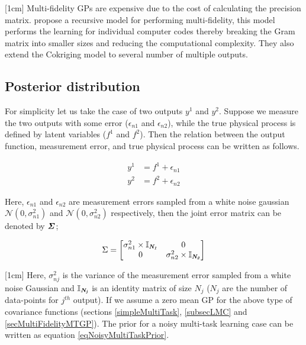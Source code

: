 [1cm]
Multi-fidelity GPs are expensive due to the cost of calculating the precision matrix. \cite{le2013multi} propose a recursive model for performing multi-fidelity, this model performs the learning for individual computer codes thereby breaking the Gram matrix into smaller sizes and reducing the computational complexity. They also extend the Cokriging model to several number of multiple outputs.

\subsection{Posterior distribution}\label{subsecPosteriorDistribution}
For simplicity let us take the case of two outputs \(y^{1}\) and \(y^{2}\). Suppose we measure the two outputs with some error ($\epsilon_{n1}$ and $\epsilon_{n2}$), while the true physical process is defined by latent variables (\(f^{1}\) and \(f^{2}\)). Then the relation between the output function, measurement error, and true physical process can be written as follows. 

\begin{align} \label{eq:relationOutputLatent}
y^{1} & = f^{1} + \epsilon_{n1} \\
y^{2} & = f^{2} + \epsilon_{n2}
\end{align} 

Here, \(\epsilon_{n1}\) and \(\epsilon_{n2}\) are measurement errors sampled from a white noise gaussian \(\mathcal{N}(0, \sigma_{n1}^2)\) and \(\mathcal{N}(0, \sigma_{n2}^2)\) respectively, then the joint error matrix can be denoted by \(\bm{\mathit{\Sigma}}\);

\begin{equation}\label{eq:sigmaToError}
         \Sigma = 
          \begin{bmatrix}
          \sigma _{n1}^{2} \times \bm{\mathit{\mathbb{I}_{N_{1}}}} & 0 \\ 
          0 & \sigma _{n2}^{2} \times \bm{\mathit{\mathbb{I}_{N_{2}}}}
          \end{bmatrix} 
\end{equation}

[1cm]
Here, \(\sigma_{nj}^2\) is the variance of the measurement error sampled from a white noise Gaussian and \(\bm{\mathit{\mathbb{I}_{N_{j}}}}\) is an identity matrix of size \(N_{j}\) (\(N_{j}\) are the number of data-points for \(j^{th}\) output). If we assume a zero mean GP for the above type of covariance functions (sections \ref{simpleMultiTask}, \ref{subsecLMC} and \ref{secMultiFidelityMTGP}). The prior for a noisy multi-task learning case can be written as equation \ref{eqNoisyMultiTaskPrior}.

